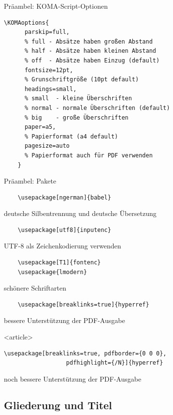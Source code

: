 \begin{Frame}[fragile]{Präambel: KOMA-Script-Optionen}
  \begin{lstlisting}[gobble=4]
    \KOMAoptions{
      parskip=full,
      % full - Absätze haben großen Abstand
      % half - Absätze haben kleinen Abstand
      % off  - Absätze haben Einzug (default)
      fontsize=12pt,
      % Grunschriftgröße (10pt default)
      headings=small,
      % small  - kleine Überschriften
      % normal - normale Überschriften (default)
      % big    - große Überschriften
      paper=a5,
      % Papierformat (a4 default)
      pagesize=auto
      % Papierformat auch für PDF verwenden
    }
  \end{lstlisting}
\end{Frame}

\begin{Frame}[fragile]{Präambel: Pakete}
  \begin{lstlisting}
    \usepackage[ngerman]{babel}
  \end{lstlisting}
  deutsche Silbentrennung und deutsche Übersetzung
  \begin{lstlisting}
    \usepackage[utf8]{inputenc}
  \end{lstlisting}
  UTF-8 als Zeichenkodierung verwenden
  \begin{lstlisting}
    \usepackage[T1]{fontenc}
    \usepackage{lmodern}
  \end{lstlisting}
  schönere Schriftarten
  \begin{lstlisting}
    \usepackage[breaklinks=true]{hyperref}
  \end{lstlisting}
  bessere Unterstützung der PDF-Ausgabe
  \begin{onlyenv}<article>
    \begin{lstlisting}[gobble=6]
      \usepackage[breaklinks=true, pdfborder={0 0 0},
                  pdfhighlight={/N}]{hyperref}
    \end{lstlisting}
    noch bessere Unterstützung der PDF-Ausgabe
  \end{onlyenv}
\end{Frame}

\subsection{Gliederung und Titel}

